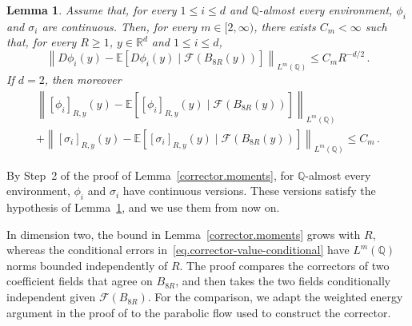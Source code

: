 \documentclass[11pt]{amsart}
\newtheorem{lemma}[proposition]{Lemma}
\theoremstyle{definition}
\theoremstyle{remark}
\numberwithin{equation}{section}
\newcommand{\E}{\mathbb E}
\newcommand{\Q}{\mathbb Q}
\newcommand{\R}{\mathbb R}
\begin{document}
\begin{lemma}\label{corrector.conditional}
Assume that, for every $1\leq i\leq d$ and $\Q$-almost every environment, $\phi_i$ and $\sigma_i$ are continuous. Then, for every $m\in[2,\infty)$, there exists $C_m<\infty$ such that, for every $R\geq1$, $y\in\R^d$ and $1\leq i\leq d$,
\begin{equation}\label{eq.corrector-gradient-conditional}
 \left\|D\phi_i(y)-\E[D\phi_i(y)\mid\mathcal F(B_{8R}(y))]\right\|_{L^m(\Q)}
 \leq C_mR^{-d/2}\, .
\end{equation}
If $d=2$, then moreover
\begin{multline}\label{eq.corrector-value-conditional}
 \left\|[\phi_i]_{R,y}(y)-\E[[\phi_i]_{R,y}(y)\mid\mathcal F(B_{8R}(y))]\right\|_{L^m(\Q)}\\
 +\left\|[\sigma_i]_{R,y}(y)-\E[[\sigma_i]_{R,y}(y)\mid\mathcal F(B_{8R}(y))]\right\|_{L^m(\Q)}
 \leq C_m\, .
\end{multline}
\end{lemma}

By Step~2 of the proof of Lemma~\ref{corrector.moments}, for $\Q$-almost every environment, $\phi_i$ and $\sigma_i$ have continuous versions. These versions satisfy the hypothesis of Lemma~\ref{corrector.conditional}, and we use them from now on.

In dimension two, the bound in Lemma~\ref{corrector.moments} grows with $R$, whereas the conditional errors in~\eqref{eq.corrector-value-conditional} have $L^m(\Q)$ norms bounded independently of $R$. The proof compares the correctors of two coefficient fields that agree on $B_{8R}$, and then takes the two fields conditionally independent given $\mathcal F(B_{8R})$. For the comparison, we adapt the weighted energy argument in the proof of \citet[Lemma~12]{GloriaOtto2016corrector} to the parabolic flow used to construct the corrector.
\end{document}

